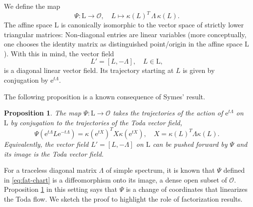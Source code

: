 \documentclass[reqno]{amsart}
\newcommand{\cO}{\mathcal{O}}
\renewcommand{\L}{\mathrm{L}}
\newtheorem{proposition}{Proposition}
\theoremstyle{definition} %
\begin{document}
We define the map
\begin{equation}\label{eq:fat-chart}\Psi:\L\longrightarrow\cO,\quad L\mapsto \kappa(L)^T\, \Lambda\, \kappa(L).
 \end{equation}
The affine space $\L$ is canonically isomorphic to the vector space of strictly lower triangular matrices: Non-diagonal entries are linear variables (more conceptually,  one chooses the identity matrix as distinguished point/origin in the affine space $\L$). With this in mind, the vector field
\begin{equation}\label{eq:diagonal-linear}L'=[L,-\Lambda],\quad L\in \L,
\end{equation}
is a  diagonal linear vector field. Its trajectory starting at $L$ is given by conjugation by $\mathrm{e}^{t\Lambda}$.



The following proposition is a  known consequence of Symes' result.
\begin{proposition}\label{pro:Toda}
The map $\Psi: \L\to \cO $ takes  the trajectories of the action of $\mathrm{e}^{t\Lambda}$ on $\L$ by conjugation to the trajectories of the Toda vector field,
\[\Psi(\mathrm{e}^{t\Lambda}L\mathrm{e}^{-t\Lambda})=\kappa(\mathrm{e}^{tX})^T X  \kappa(\mathrm{e}^{tX}),
\quad X=\kappa(L)^T\Lambda \kappa(L).\]
Equivalently, the vector field  $L'=[L,-\Lambda]$  on $\L$
can be pushed forward by $\Psi$ and its image is the Toda vector field.
\end{proposition}



For a traceless diagonal matrix $\Lambda$ of simple spectrum,   it is known that $\Psi$ defined in  \eqref{eq:fat-chart} is a diffeomorphism onto its image, a dense open subset of $\cO$. Proposition \ref{pro:Toda} in this setting says that $\Psi$ is a change of coordinates that linearizes the Toda flow. We sketch the proof to highlight the role of factorization results. 
\end{document}
